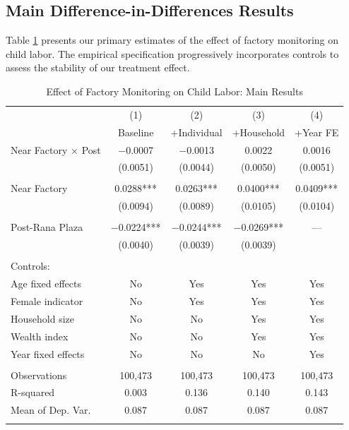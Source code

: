 \documentclass[12pt]{article}
\begin{document}
\subsection{Main Difference-in-Differences Results}

Table \ref{tab:main_results_updated} presents our primary estimates of the effect of factory monitoring on child labor. The empirical specification progressively incorporates controls to assess the stability of our treatment effect.

\begin{table}[H]
\centering
\caption{Effect of Factory Monitoring on Child Labor: Main Results}
\label{tab:main_results_updated}
\begin{threeparttable}
\begin{tabular}{lcccc}
\toprule
& (1) & (2) & (3) & (4) \\
& Baseline & +Individual & +Household & +Year FE \\
\midrule
Near Factory $\times$ Post & $-$0.0007 & $-$0.0013 & 0.0022 & 0.0016 \\
& (0.0051) & (0.0044) & (0.0050) & (0.0051) \\
& & & & \\
Near Factory & 0.0288*** & 0.0263*** & 0.0400*** & 0.0409*** \\
& (0.0094) & (0.0089) & (0.0105) & (0.0104) \\
& & & & \\
Post-Rana Plaza & $-$0.0224*** & $-$0.0244*** & $-$0.0269*** & --- \\
& (0.0040) & (0.0039) & (0.0039) & \\
\\
\midrule
Controls: & & & & \\
\quad Age fixed effects & No & Yes & Yes & Yes \\
\quad Female indicator & No & Yes & Yes & Yes \\
\quad Household size & No & No & Yes & Yes \\
\quad Wealth index & No & No & Yes & Yes \\
\quad Year fixed effects & No & No & No & Yes \\
\\
\midrule
Observations & 100,473 & 100,473 & 100,473 & 100,473 \\
R-squared & 0.003 & 0.136 & 0.140 & 0.143 \\
Mean of Dep. Var. & 0.087 & 0.087 & 0.087 & 0.087 \\
\\
\bottomrule

\end{tabular}
\end{threeparttable}
\end{table}
\end{document}
